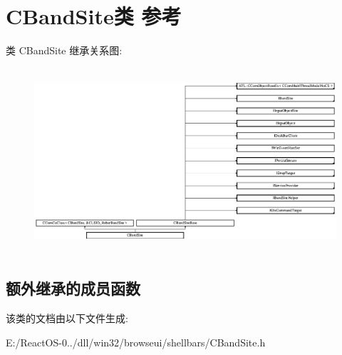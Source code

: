 \hypertarget{class_c_band_site}{}\section{C\+Band\+Site类 参考}
\label{class_c_band_site}
类 C\+Band\+Site 继承关系图\+:\begin{figure}[H]
\begin{center}
\leavevmode
\includegraphics[height=6.893939cm]{class_c_band_site}
\end{center}
\end{figure}
\subsection*{额外继承的成员函数}


该类的文档由以下文件生成\+:\begin{DoxyCompactItemize}
\item 
E\+:/\+React\+O\+S-\/0../dll/win32/browseui/shellbars/C\+Band\+Site.\+h\end{DoxyCompactItemize}
